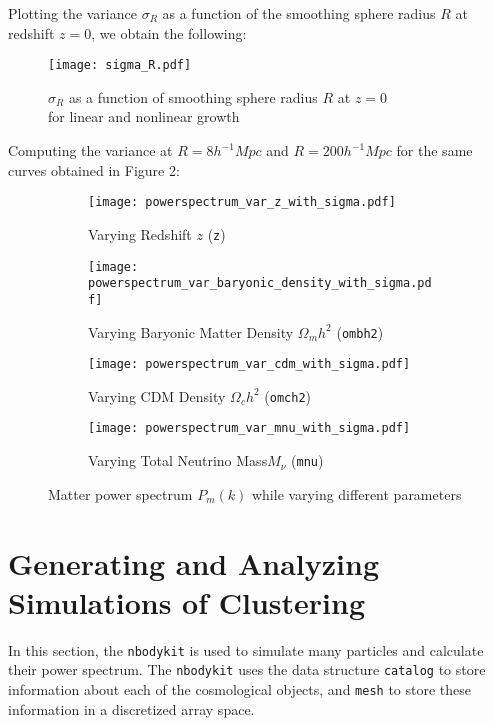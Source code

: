 \documentclass[11pt, letterpaper, twoside]{article}
\begin{document}
Plotting the variance $\sigma_R$ as a function of the smoothing sphere radius $R$ at redshift $z = 0$, we obtain the following:
\begin{figure}[h!]
    \centering
    \texttt{[image: sigma\_R.pdf]}
    \caption{$\sigma_R$ as a function of smoothing sphere radius $R$ at $z = 0$\\for linear and nonlinear growth}
    \label{fig:sigma_R}
\end{figure}

Computing the variance at $R = 8 h^{-1} Mpc$ and $R = 200 h^{-1} Mpc$ for the same curves obtained in Figure 2:

\begin{figure}[h!]
    \centering
    \begin{subfigure}[b]{0.49\textwidth}
        \texttt{[image: powerspectrum\_var\_z\_with\_sigma.pdf]}
        \cprotect\caption{Varying Redshift $z$ (\verb|z|)}
    \end{subfigure}
    \begin{subfigure}[b]{0.49\textwidth}
        \texttt{[image: powerspectrum\_var\_baryonic\_density\_with\_sigma.pdf]}
        \cprotect\caption{Varying Baryonic Matter Density $\Omega_m h^2$ (\verb|ombh2|)}
    \end{subfigure}
    \begin{subfigure}[b]{0.49\textwidth}
        \texttt{[image: powerspectrum\_var\_cdm\_with\_sigma.pdf]}
        \cprotect\caption{Varying CDM Density $\Omega_c h^2$ (\verb|omch2|)}
    \end{subfigure}
    \begin{subfigure}[b]{0.49\textwidth}
        \texttt{[image: powerspectrum\_var\_mnu\_with\_sigma.pdf]}
        \cprotect\caption{Varying Total Neutrino Mass$M_\nu$ (\verb|mnu|)}
    \end{subfigure}
    \caption{Matter power spectrum $P_m(k)$ while varying different parameters}
    \label{fig:powerspectrum_var_par}
\end{figure}



\newpage
\section{Generating and Analyzing Simulations of Clustering}
In this section, the \verb|nbodykit| is used to simulate many particles and calculate their power spectrum. The \verb|nbodykit| uses the data structure \verb|catalog| to store information about each of the cosmological objects, and \verb|mesh| to store these information in a discretized array space. 
\end{document}
